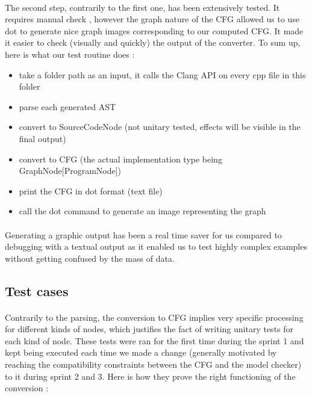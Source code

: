 \documentclass{report}
\begin{document}
\paragraph{}
\hspace{4mm}The second step, contrarily to the first one, has been extensively tested. It requires manual check , however the graph nature of the CFG allowed us to use dot to generate nice graph images
corresponding to our computed CFG. It made it easier to check (visually and quickly) the output of the converter.
To sum up, here is what our test routine does :

\vspace{1.5mm}
\begin{itemize}
\item take a folder path as an input, it calls the Clang API on every cpp file in this folder\vspace{1mm}
\item parse each generated AST\vspace{1mm}
\item convert to SourceCodeNode (not unitary tested, effects will be visible in the final output)\vspace{1mm}
\item convert to CFG (the actual implementation type being 	GraphNode[ProgramNode])\vspace{1mm}
\item print the CFG in dot format (text file)\vspace{1mm}
\item call the dot command to generate an image representing the graph\vspace{1mm}
\end{itemize}

\paragraph{}
\hspace{4mm}Generating a graphic output has been a real time saver for us compared to debugging with a textual output as it enabled
us to test highly complex examples without getting confused by the mass of data.

\subsection{Test cases}

\paragraph{}
\hspace{4mm}Contrarily to the parsing, the conversion to CFG implies very specific processing for different kinds of nodes,
which justifies the fact of writing unitary tests for each kind of node. These tests were ran for the first time during the sprint 1 and kept being executed
each time we made a change (generally motivated by reaching the compatibility constraints between the CFG and the model checker)
 to it during sprint 2 and 3. Here is how they prove the right functioning of the conversion :
\end{document}
